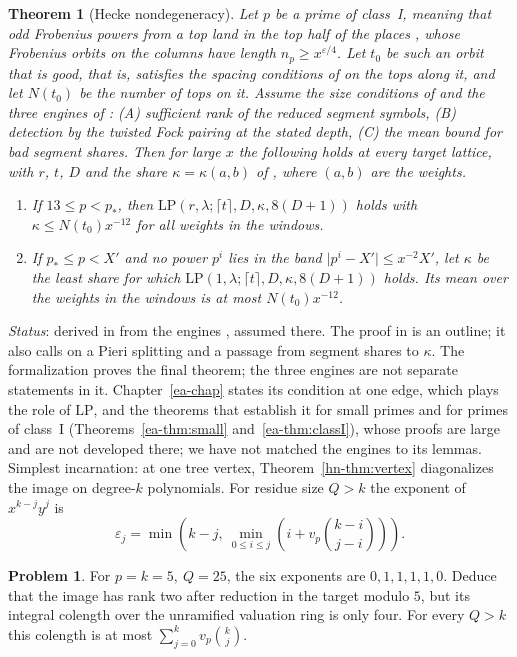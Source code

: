 \documentclass[reqno]{amsart}
\newcounter{chap}
\theoremstyle{definition}
\newtheorem{problem}{Problem}[section]
\theoremstyle{plain}
\newtheorem{theorem}{Theorem}[section]
\newcommand{\LP}{\mathrm{LP}}
\begin{document}
\begin{theorem}[Hecke nondegeneracy]\label{thm:LP}
Let \(p\) be a prime of \emph{class~I}, meaning that odd Frobenius powers from a top land in the top half of the places \cite[\S12.1]{Adr}, whose Frobenius orbits on the columns have length \(n_p\ge x^{\varepsilon/4}\).  Let \(t_0\) be such an orbit that is \emph{good}, that is, satisfies the spacing conditions of \cite[Def.~5.19]{Adr} on the tops along it, and let \(N(t_0)\) be the number of tops on it.  Assume the size conditions of \cite[\S12.6]{Adr} and the three engines of \cite[Hyp.~12.12]{Adr}: (A) sufficient rank of the reduced segment symbols, (B) detection by the twisted Fock pairing at the stated depth, (C) the mean bound for bad segment shares.  Then for large \(x\) the following holds at every target lattice, with \(r\), \(t\), \(D\) and the share \(\kappa=\kappa(a,b)\) of \cite[Thm.~12.11]{Adr}, where \((a,b)\) are the weights.
\begin{enumerate}
\item[(i)] If \(13\le p<p_*\), then \(\LP(r,\lambda;\lceil t\rceil,D,\kappa,8(D+1))\) holds with \(\kappa\le N(t_0)x^{-12}\) for all weights in the windows.
\item[(ii)] If \(p_*\le p<X'\) and no power \(p^i\) lies in the band \(\lvert p^i-X'\rvert\le x^{-2}X'\), let \(\kappa\) be the least share for which \(\LP(1,\lambda;\lceil t\rceil,D,\kappa,8(D+1))\) holds.  Its mean over the weights in the windows is at most \(N(t_0)x^{-12}\).
\end{enumerate}
\end{theorem}
\noindent \emph{Status}: derived in \cite[Thm.~12.11, Cor.~12.13]{Adr} from the engines \cite[Hyp.~12.12]{Adr}, assumed there.  The proof in \cite[Thm.~12.11]{Adr} is an outline; it also calls on a Pieri splitting and a passage from segment shares to \(\kappa\).  The formalization proves the final theorem; the three engines are not separate statements in it.  Chapter~\ref{ea-chap} states its condition at one edge, which plays the role of \(\LP\), and the theorems that establish it for small primes and for primes of class~I (Theorems~\ref{ea-thm:small} and~\ref{ea-thm:classI}), whose proofs are large and are not developed there; we have not matched the engines to its lemmas.  Simplest incarnation: at one tree vertex, Theorem~\ref{hn-thm:vertex} diagonalizes the image on degree-\(k\) polynomials. For residue size \(Q>k\) the exponent of \(x^{k-j}y^j\) is
\[
 \varepsilon_j=\min\left(k-j,\ \min_{0\le i\le j}
              \left(i+v_p{\binom{k-i}{j-i}}\right)\right).
\]
\begin{problem}\label{pr:vertex}
For \(p=k=5,\ Q=25\), the six exponents are \(0,1,1,1,1,0\). Deduce that the image has rank two after reduction in the target modulo \(5\), but its integral colength over the unramified valuation ring is only four. For every \(Q>k\) this colength is at most \(\sum_{j=0}^k v_p\binom kj\).
\end{problem}
\end{document}
